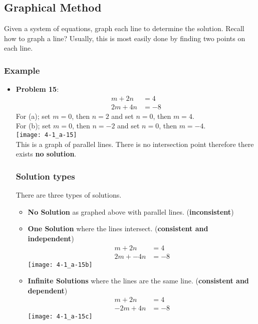 \documentclass[14pt]{extarticle}
\begin{document}
\subsection*{Graphical Method}
Given a system of equations, graph each line to determine the solution. Recall how to graph a line? Usually, this is most easily done by finding two points on each line.
\subsubsection*{Example}
\begin{itemize}
\item \textbf{Problem 15}:
\begin{align*}
	m+2n &= 4 \tag{a}\\
	2m + 4n &= -8 \tag{b}
\end{align*}
For (a); set $m=0$, then $n=2$ and set $n=0$, then $m=4$.\\
For (b); set $m=0$, then $n=-2$ and set $n=0$, then $m=-4$. \\
\texttt{[image: 4-1\_a-15]} \\
This is a graph of parallel lines. There is no intersection point therefore there exists \textbf{no solution}.
\subsubsection*{Solution types}
There are three types of solutions.
\begin{itemize}
	\item \textbf{No Solution} as graphed above with parallel lines. (\textbf{inconsistent})
	\item \textbf{One Solution} where the lines intersect. (\textbf{consistent and independent})
	\begin{align*}
		m+2n &= 4 \tag{a}\\
		2m + -4n &= -8 \tag{c}
	\end{align*}
	\texttt{[image: 4-1\_a-15b]}
	\item \textbf{Infinite Solutions} where the lines are the same line. (\textbf{consistent and dependent})
	\begin{align*}
		m+2n &= 4 \tag{a}\\
		-2m + 4n &= -8 \tag{d}
	\end{align*}
	\texttt{[image: 4-1\_a-15c]}
\end{itemize}
\end{itemize}
\end{document}
